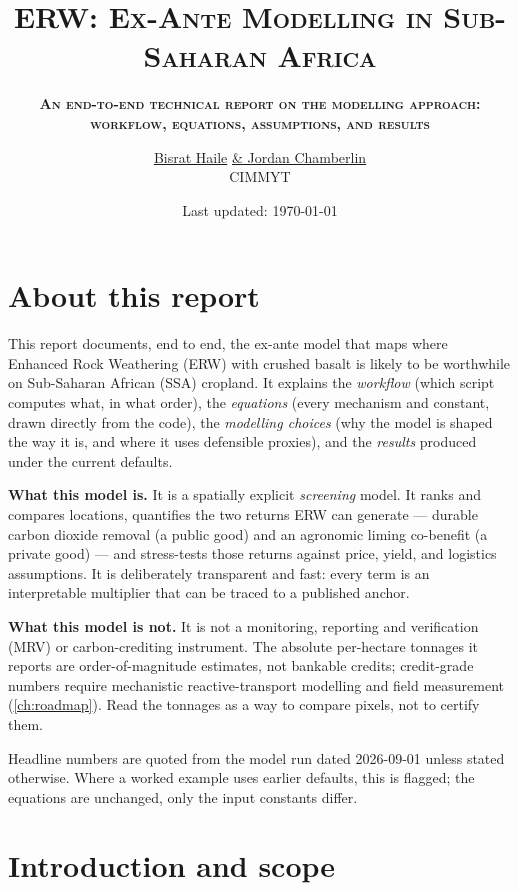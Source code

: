 \documentclass[openany]{book}
\title{\huge{\textbf{ERW:}} \textsc{Ex-Ante Modelling in Sub-Saharan Africa}}
\subtitle{\textsc{\large \textbf{An end-to-end technical report on the modelling
approach: workflow, equations, assumptions, and results}}}
\author{\href{mailto:bismignot@gmail.com}{Bisrat Haile}  \href{mailto:j.chamberlin@cgiar.org}{\& Jordan Chamberlin}\\CIMMYT}
\date{Last updated: \today}
\begin{document}
\frontmatter
\maketitle
\tableofcontents
\newpage
\listoffigures
\listoftables
\mainmatter

\chapter*{About this report}

This report documents, end to end, the ex-ante model that maps where Enhanced
Rock Weathering (ERW) with crushed basalt is likely to be worthwhile on
Sub-Saharan African (SSA) cropland. It explains the \emph{workflow} (which
script computes what, in what order), the \emph{equations} (every mechanism and
constant, drawn directly from the code), the \emph{modelling choices} (why the
model is shaped the way it is, and where it uses defensible proxies), and the
\emph{results} produced under the current defaults.

\textbf{What this model is.} It is a spatially explicit \emph{screening} model.
It ranks and compares locations, quantifies the two returns ERW can generate ---
durable carbon dioxide removal (a public good) and an agronomic liming
co-benefit (a private good) --- and stress-tests those returns against price,
yield, and logistics assumptions. It is deliberately transparent and fast: every
term is an interpretable multiplier that can be traced to a published anchor.

\textbf{What this model is not.} It is not a monitoring, reporting and
verification (MRV) or carbon-crediting instrument. The absolute per-hectare
tonnages it reports are order-of-magnitude estimates, not bankable credits;
credit-grade numbers require mechanistic reactive-transport modelling and field
measurement (\autoref{ch:roadmap}). Read the tonnages as a way to compare
pixels, not to certify them.


Headline numbers are quoted from the model run dated 2026-09-01 unless stated
otherwise. Where a worked example uses earlier defaults, this is flagged; the
equations are unchanged, only the input constants differ.

\chapter{Introduction and scope}\label{ch:intro}
\end{document}
